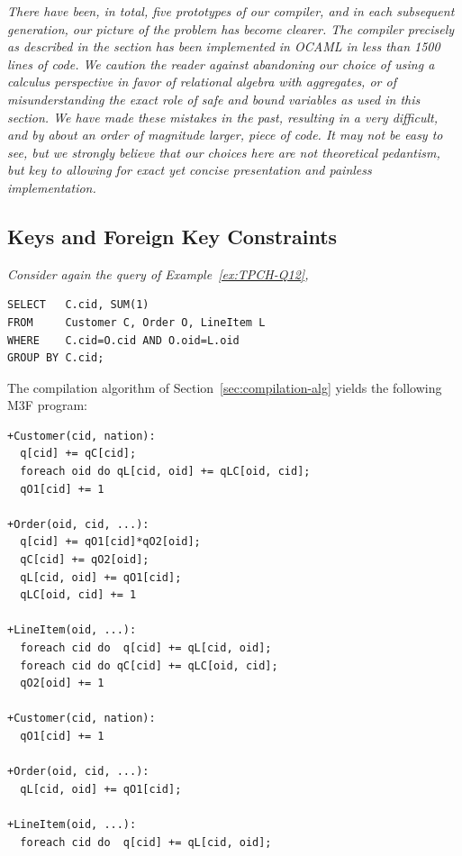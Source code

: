\begin{remark}
\em
There have been, in total, five prototypes of our compiler, and
in each subsequent generation, our picture of the problem has become clearer.
The compiler precisely as described in the section has been implemented
in OCAML in less than 1500 lines of code. We caution the reader against
abandoning our choice of using a calculus perspective
in favor of relational algebra with aggregates, or of misunderstanding
the exact role of safe and bound variables as used in this section.
We have made these mistakes in the past, resulting in 
a very difficult, and by about an order of magnitude larger, piece of code.
It may not be easy to see, but we strongly believe that
our choices here are not theoretical pedantism,
but key to allowing for exact yet concise presentation
and painless implementation.
\end{remark}


\subsection{Keys and Foreign Key Constraints}


\begin{example}\em
Consider again the query of Example~\ref{ex:TPCH-Q12},
\begin{verbatim}
SELECT   C.cid, SUM(1)
FROM     Customer C, Order O, LineItem L
WHERE    C.cid=O.cid AND O.oid=L.oid
GROUP BY C.cid;
\end{verbatim}

The compilation algorithm of Section~\ref{sec:compilation-alg} yields the
following M3F program:
\begin{verbatim}
+Customer(cid, nation):
  q[cid] += qC[cid];
  foreach oid do qL[cid, oid] += qLC[oid, cid];
  qO1[cid] += 1

+Order(oid, cid, ...):
  q[cid] += qO1[cid]*qO2[oid];
  qC[cid] += qO2[oid];
  qL[cid, oid] += qO1[cid];
  qLC[oid, cid] += 1

+LineItem(oid, ...):
  foreach cid do  q[cid] += qL[cid, oid];
  foreach cid do qC[cid] += qLC[oid, cid];
  qO2[oid] += 1

+Customer(cid, nation):
  qO1[cid] += 1

+Order(oid, cid, ...):
  qL[cid, oid] += qO1[cid];

+LineItem(oid, ...):
  foreach cid do  q[cid] += qL[cid, oid];
\end{verbatim}
\end{example}


